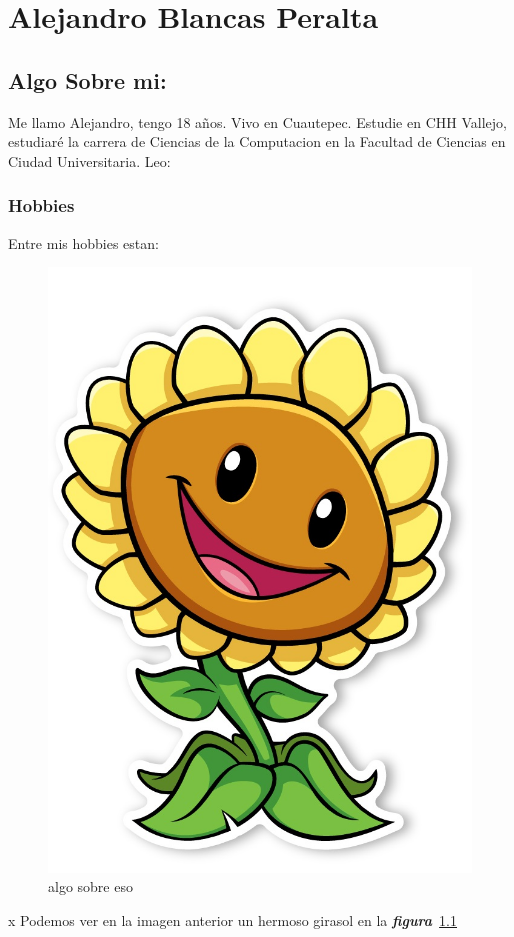 \chapter{Alejandro Blancas Peralta}

\section{Algo Sobre mi:}
Me llamo Alejandro, tengo 18 años. Vivo en Cuautepec. Estudie en CHH Vallejo, estudiaré la carrera de Ciencias de la Computacion en la Facultad de Ciencias en Ciudad Universitaria.
 Leo:~\cite{comunidad,torres,retorno}

\subsection{Hobbies}
Entre mis hobbies estan:

\begin{enumerate}
  \item{Jugar Videojuegos
  \item{Dibujar
  \item{PvZx
\end{enumerate}

\begin{figure}[h]
  \centering
  \includegraphics[scale=0.2]{IMG/Girasol_.jpg}
  \caption{\small algo sobre eso} \label{fig:Girasol_}
\end{figure}
x
Podemos ver en la imagen anterior un hermoso girasol en la
\emph{\textbf{figura}}~\ref{fig:Girasol_}

